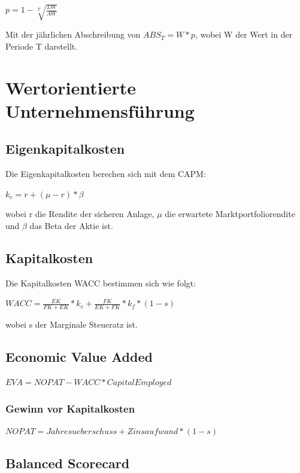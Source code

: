 \documentclass{article}
\begin{document}
\begin{center}
$ p = 1 - \sqrt[T]{\frac{LW}{AW}}$
\end{center}

Mit der jährlichen Abschreibung von $ABS_T = W * p$, wobei W der Wert in der Periode T darstellt.

\section{Wertorientierte Unternehmensführung}

\subsection{Eigenkapitalkosten}
Die Eigenkapitalkosten berechen sich mit dem CAPM:
\begin{center}

$ k_e = r + ( \mu - r ) * \beta $
\end{center}
wobei r die Rendite der sicheren Anlage, $ \mu $ die erwartete Marktportfoliorendite und  $ \beta $ das Beta der Aktie ist.

\subsection{Kapitalkosten}
Die Kapitalkosten WACC bestimmen sich wie folgt:
\begin{center}

$WACC = \frac{EK}{FK + EK} * k_{e} + \frac{FK}{EK + FK} * k_{f} * (1-s)$
\end{center}
wobei s der Marginale Steueratz ist.

\subsection{Economic Value Added}
\begin{center}

$EVA =  NOPAT - WACC * CapitalEmployed $
\end{center}
\subsubsection{Gewinn vor Kapitalkosten}
\begin{center}

$NOPAT = Jahresueberschuss + Zinsaufwand * (1 - s)$
\end{center}
\subsection{Balanced Scorecard}
\end{document}
